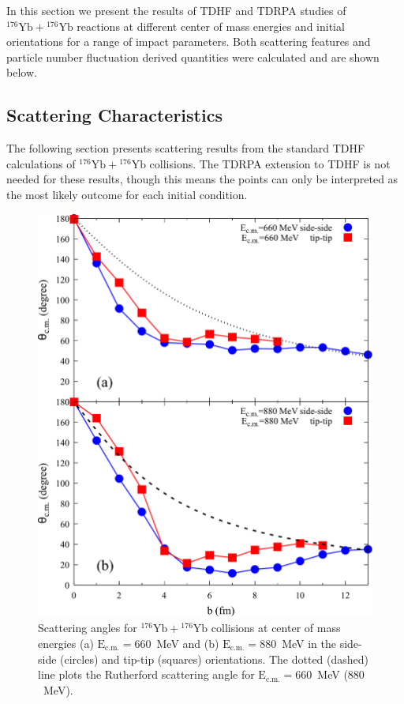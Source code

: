 In this section we present the results of TDHF and TDRPA studies of $^{176}\mathrm{Yb}+{}^{176}\mathrm{Yb}$ reactions at different center of mass energies and initial orientations  for a range of impact parameters.
Both scattering features and particle number fluctuation derived quantities were calculated and are shown below.


\subsection{Scattering Characteristics}\label{sec:scat}

The following section presents scattering results from the standard TDHF calculations of $^{176}\mathrm{Yb}+{}^{176}\mathrm{Yb}$ collisions.
The TDRPA extension to TDHF is not needed for these results, though this means the points can only be interpreted as the most likely outcome for each initial condition.

\begin{figure}
	\includegraphics*[width=\textwidth]{../Figures/YbYb/Scattering.pdf}
	\caption{Scattering angles for $^{176}\mathrm{Yb}+{}^{176}\mathrm{Yb}$ collisions at center of mass energies (a) $\mathrm{E_{c.m.}}=660$~MeV and (b) $\mathrm{E_{c.m.}}=880$~MeV in the side-side (circles) and tip-tip (squares) orientations. The  dotted (dashed) line plots the Rutherford scattering angle for $\mathrm{E_{c.m.}}=660$~MeV ($880$~MeV).}
	\label{fig:bvstheta}
\end{figure}

